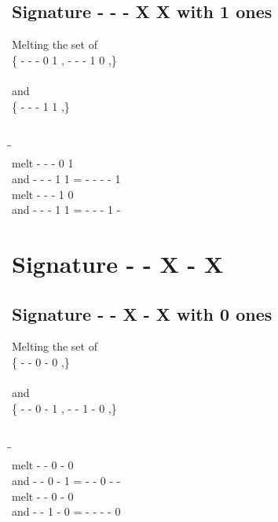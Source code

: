 \documentclass{article}
\begin{document}
\subsection{Signature - - - X X with 1 ones}
Melting the set of\\
\{ -  -  -  0  1 , -  -  -  1  0 ,\}\\\\
and\\
\{ -  -  -  1  1 ,\}\\\\
\begin{tabbing}
\hspace{3cm}\=\hspace{3cm}\=\hspace{3cm}\\[1cm]
melt\> -  -  -  0  1 \\
and\> -  -  -  1  1 \>
 =  -  -  -  -  1 \\[1mm]
melt\> -  -  -  1  0 \\
and\> -  -  -  1  1 \>
 =  -  -  -  1  - \\[1mm]
\end{tabbing}
\newpage
\section{Signature - - X - X }
\subsection{Signature - - X - X with 0 ones}
Melting the set of\\
\{ -  -  0  -  0 ,\}\\\\
and\\
\{ -  -  0  -  1 , -  -  1  -  0 ,\}\\\\
\begin{tabbing}
\hspace{3cm}\=\hspace{3cm}\=\hspace{3cm}\\[1cm]
melt\> -  -  0  -  0 \\
and\> -  -  0  -  1 \>
 =  -  -  0  -  - \\[1mm]
melt\> -  -  0  -  0 \\
and\> -  -  1  -  0 \>
 =  -  -  -  -  0 \\[1mm]
\end{tabbing}
\newpage
\end{document}
